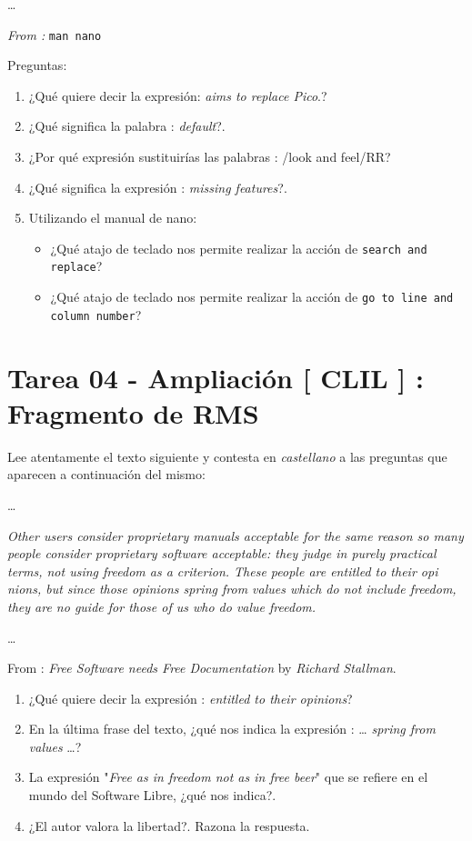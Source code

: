 \documentclass[11pt]{article}
\begin{document}
\ldots{} 

\emph{From :}  \texttt{man nano}

Preguntas:

\begin{enumerate}
\item ¿Qué quiere decir la expresión: \emph{aims to replace Pico}.?
\item ¿Qué significa la palabra : \emph{default}?.
\item ¿Por qué expresión sustituirías las palabras : /look and feel/RR?
\item ¿Qué significa la expresión : \emph{missing features}?.
\item Utilizando el manual de nano:

\begin{itemize}
\item ¿Qué atajo de teclado nos permite realizar la acción de \texttt{search and replace}?
\item ¿Qué atajo de teclado nos permite realizar la acción de \texttt{go to line and column number}?
\end{itemize}
\end{enumerate}

\section{Tarea 04 - Ampliación [ CLIL ] : Fragmento de RMS}
\label{sec:org2620969}

Lee atentamente el texto siguiente y contesta en \emph{castellano} a las 
preguntas que aparecen a continuación del mismo:

\ldots{}

\emph{Other users consider proprietary manuals acceptable for the same reason so many}
\emph{people consider proprietary software acceptable: they judge in purely practical}
\emph{terms, not using freedom as a criterion. These people are entitled to their opi}
\emph{nions, but since those opinions spring from values which do not include freedom,}
\emph{they are no guide for those of us who do value freedom.}

\ldots{}

From : \emph{Free Software needs Free Documentation} by \emph{Richard Stallman}.


\begin{enumerate}
\item ¿Qué quiere decir la expresión : \emph{entitled to their opinions}?
\item En la última frase del texto, ¿qué nos indica la expresión : \ldots{} \emph{spring from values} \ldots{}?
\item La expresión "\emph{Free as in freedom not as in free beer}" que se refiere en el mundo del Software Libre, ¿qué nos indica?.
\item ¿El autor valora la libertad?. Razona la respuesta.
\end{enumerate}
\end{document}
